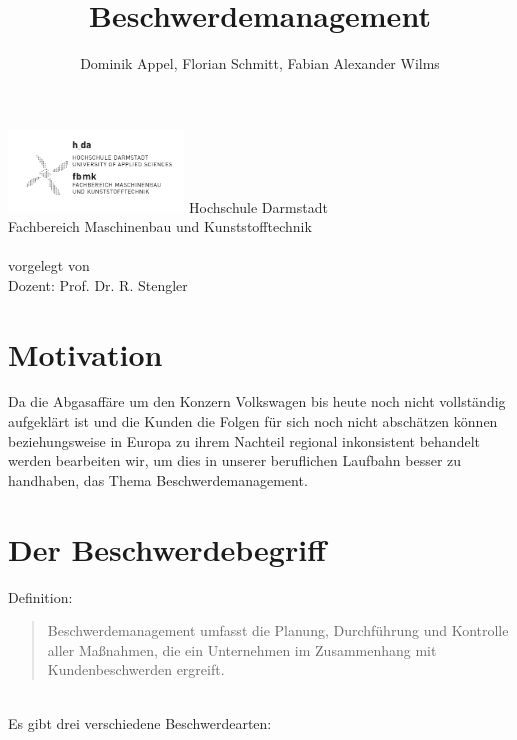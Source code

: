 \documentclass[a4paper,12pt]{article}
\title{Beschwerdemanagement}
\author{Dominik Appel, Florian Schmitt, Fabian Alexander Wilms}
\begin{document}
	\pagestyle{empty}
	\begin{center}
		\includegraphics[width=0.35\textwidth]{fig/Logo/h-da-fbmk-logo-sw.pdf}
		\vfill
		\Large Hochschule Darmstadt \\
		\vspace{12pt}
		Fachbereich Maschinenbau und Kunststofftechnik \normalsize \\
		\vfill
		\makeatletter
		\@title \\
		\vfill
		vorgelegt von \\
		\vspace{12pt}
		\@author
		\makeatother
		\vfill
		Dozent: Prof. Dr. R. Stengler\\
	\end{center}
	\newpage
	\pagestyle{plain}
	\tableofcontents
	\newpage
	\section*{Motivation}
	Da die Abgasaffäre um den Konzern Volkswagen bis heute noch nicht vollständig aufgeklärt ist und die Kunden die Folgen für sich noch nicht abschätzen können beziehungsweise in Europa zu ihrem Nachteil regional inkonsistent behandelt werden bearbeiten wir, um dies in unserer beruflichen Laufbahn besser zu handhaben, das Thema Beschwerdemanagement.
	\section{Der Beschwerdebegriff}
	\begin{center}
		Definition:
	\end{center}
	\blockquote{Beschwerdemanagement umfasst die Planung, Durchführung und Kontrolle aller Maßnahmen, die ein Unternehmen im Zusammenhang mit Kundenbeschwerden ergreift.} {\cite{.02.04.2016}} \\
	
	Es gibt drei verschiedene Beschwerdearten:
	
\end{document}
